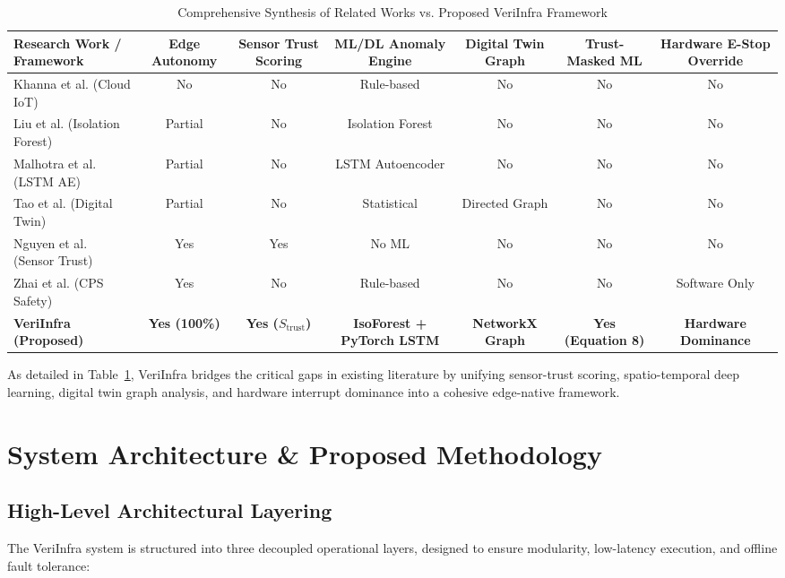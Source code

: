 \documentclass[conference]{IEEEtran}
\begin{document}
\begin{table}[htbp]
\caption{Comprehensive Synthesis of Related Works vs. Proposed VeriInfra Framework}
\label{tab:lit_synthesis}
\begin{center}
\begin{tabular}{|l|c|c|c|c|c|c|}
\hline
\textbf{Research Work / Framework} & \textbf{Edge Autonomy} & \textbf{Sensor Trust Scoring} & \textbf{ML/DL Anomaly Engine} & \textbf{Digital Twin Graph} & \textbf{Trust-Masked ML} & \textbf{Hardware E-Stop Override} \\
\hline
Khanna et al. \cite{b9} (Cloud IoT) & No & No & Rule-based & No & No & No \\
Liu et al. \cite{b1} (Isolation Forest) & Partial & No & Isolation Forest & No & No & No \\
Malhotra et al. \cite{b5} (LSTM AE) & Partial & No & LSTM Autoencoder & No & No & No \\
Tao et al. \cite{b2} (Digital Twin) & Partial & No & Statistical & Directed Graph & No & No \\
Nguyen et al. \cite{b16} (Sensor Trust) & Yes & Yes & No ML & No & No & No \\
Zhai et al. \cite{b17} (CPS Safety) & Yes & No & Rule-based & No & No & Software Only \\
\hline
\textbf{VeriInfra (Proposed)} & \textbf{Yes (100\%)} & \textbf{Yes ($S_{\text{trust}}$)} & \textbf{IsoForest + PyTorch LSTM} & \textbf{NetworkX Graph} & \textbf{Yes (Equation 8)} & \textbf{Hardware Dominance} \\
\hline
\end{tabular}
\end{center}
\end{table}

As detailed in Table~\ref{tab:lit_synthesis}, VeriInfra bridges the critical gaps in existing literature by unifying sensor-trust scoring, spatio-temporal deep learning, digital twin graph analysis, and hardware interrupt dominance into a cohesive edge-native framework.

\section{System Architecture \& Proposed Methodology}
\label{sec:methodology}

\subsection{High-Level Architectural Layering}
The VeriInfra system is structured into three decoupled operational layers, designed to ensure modularity, low-latency execution, and offline fault tolerance:
\end{document}
